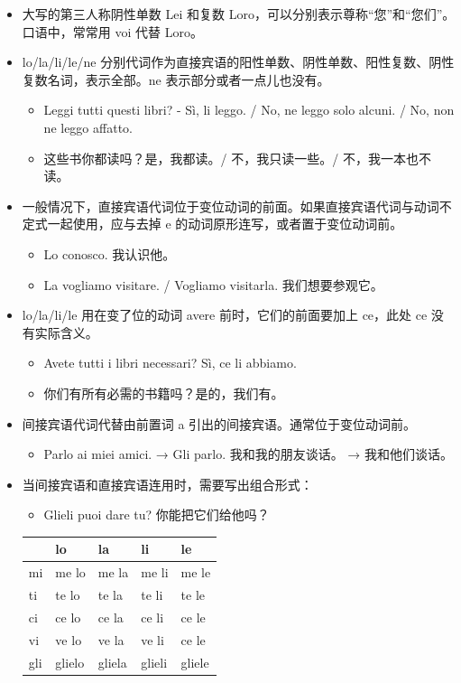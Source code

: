 \documentclass[UTF8,a4paper,titlepage,10pt]{report}
\begin{document}
\begin{enumerate}
\begin{itemize}
\item 大写的第三人称阴性单数 Lei 和复数 Loro，可以分别表示尊称“您”和“您们”。口语中，常常用 voi 代替 Loro。
\item lo/la/li/le/ne 分别代词作为直接宾语的阳性单数、阴性单数、阳性复数、阴性复数名词，表示全部。ne 表示部分或者一点儿也没有。
\begin{itemize}
\item Leggi tutti questi libri? - Sì, li leggo. / No, ne leggo solo alcuni. / No, non ne leggo affatto.
\item 这些书你都读吗？是，我都读。/ 不，我只读一些。/ 不，我一本也不读。
\end{itemize}
\item 一般情况下，直接宾语代词位于变位动词的前面。如果直接宾语代词与动词不定式一起使用，应与去掉 e 的动词原形连写，或者置于变位动词前。
\begin{itemize}
\item Lo conosco.  我认识他。
\item La vogliamo visitare. / Vogliamo visitarla.  我们想要参观它。
\end{itemize}
\item lo/la/li/le 用在变了位的动词 avere 前时，它们的前面要加上 ce，此处 ce 没有实际含义。
\begin{itemize}
\item Avete tutti i libri necessari? Sì, ce li abbiamo.
\item 你们有所有必需的书籍吗？是的，我们有。
\end{itemize}
\item 间接宾语代词代替由前置词 a 引出的间接宾语。通常位于变位动词前。
\begin{itemize}
\item Parlo ai miei amici. → Gli parlo.   我和我的朋友谈话。 → 我和他们谈话。
\end{itemize}
\item 当间接宾语和直接宾语连用时，需要写出组合形式：
\begin{itemize}
\item Glieli puoi dare tu? 你能把它们给他吗？
\end{itemize}
\begin{center}
\begin{tabular}{lllll}
 & lo & la & li & le\\
\hline
mi & me lo & me la & me li & me le\\
ti & te lo & te la & te li & te le\\
ci & ce lo & ce la & ce li & ce le\\
vi & ve lo & ve la & ve li & ce le\\
gli & glielo & gliela & glieli & gliele\\
\end{tabular}
\end{center}
\end{itemize}
\end{enumerate}
\end{document}
